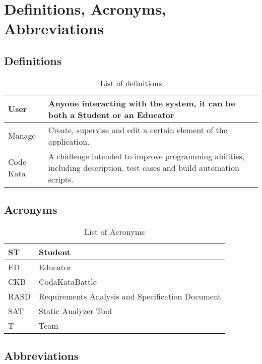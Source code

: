 \section{Definitions, Acronyms, Abbreviations}
\label{s:Definitions_Acronyms_Abbreviations}%

\subsection{Definitions}
\label{ss:Definitions}

\begin{table}[H]
  \begin{tabular}{|l|l|}

    \hline
    User & Anyone interacting with the system, it can be both a Student or an Educator    \\
    \hline
    Manage & Create, supervise and edit a certain element of the application. \\
    \hline
    Code Kata & A challenge intended to improve programming abilities, including description, test cases and build automation scripts. \\
    \hline
  \end{tabular}
  \caption{List of definitions}
  \label{tab:definitions}
\end{table}

\subsection{Acronyms}
\label{ss:Acronyms}

\begin{table}[H]
  \begin{tabular}{|l|l|}

    \hline
    ST & Student \\
    \hline
    ED & Educator \\
    \hline
    CKB & CodaKataBattle \\
    \hline
    RASD & Requirements Analysis and Specification Document     \\
    \hline
    SAT & Static Analyzer Tool    \\
    \hline
    T & Team    \\
    \hline
  \end{tabular}
  \caption{List of Acronyms}
  \label{tab:acronyms}
\end{table}

\subsection{Abbreviations}
\label{ss:Abbreviations}


